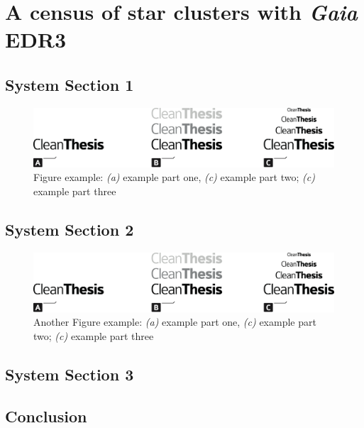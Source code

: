 %
\chapter{A census of star clusters with \emph{Gaia} EDR3}
\label{sec:census}


\Blindtext[2][1]

\section{System Section 1}
\label{sec:census:sec1}

\Blindtext[1][2]

\begin{figure}[htb]
	\includegraphics[width=\textwidth]{gfx/Clean-Thesis-Figure}
	\caption{Figure example: \textit{(a)} example part one, \textit{(c)} example part two; \textit{(c)} example part three}
	\label{fig:census:example1}
\end{figure}

\Blindtext[1][2]

\section{System Section 2}
\label{sec:census:sec2}

\Blindtext[1][2]

\begin{figure}[htb]
	\includegraphics[width=\textwidth]{gfx/Clean-Thesis-Figure}
	\caption{Another Figure example: \textit{(a)} example part one, \textit{(c)} example part two; \textit{(c)} example part three}
	\label{fig:census:example2}
\end{figure}

\Blindtext[2][2]

\section{System Section 3}
\label{sec:census:sec3}

\Blindtext[4][2]

\section{Conclusion}
\label{sec:census:conclusion}

\Blindtext[2][1]
